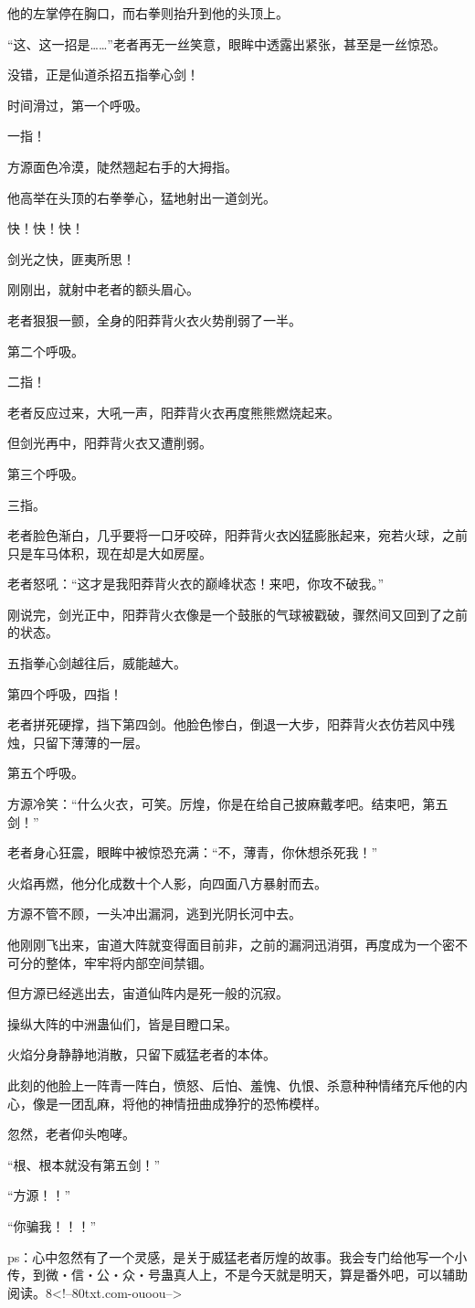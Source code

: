 \begin{this_body}
他的左掌停在胸口，而右拳则抬升到他的头顶上。

“这、这一招是……”老者再无一丝笑意，眼眸中透露出紧张，甚至是一丝惊恐。

没错，正是仙道杀招五指拳心剑！

时间滑过，第一个呼吸。

一指！

方源面色冷漠，陡然翘起右手的大拇指。

他高举在头顶的右拳拳心，猛地射出一道剑光。

快！快！快！

剑光之快，匪夷所思！

刚刚出，就射中老者的额头眉心。

老者狠狠一颤，全身的阳莽背火衣火势削弱了一半。

第二个呼吸。

二指！

老者反应过来，大吼一声，阳莽背火衣再度熊熊燃烧起来。

但剑光再中，阳莽背火衣又遭削弱。

第三个呼吸。

三指。

老者脸色渐白，几乎要将一口牙咬碎，阳莽背火衣凶猛膨胀起来，宛若火球，之前只是车马体积，现在却是大如房屋。

老者怒吼：“这才是我阳莽背火衣的巅峰状态！来吧，你攻不破我。”

刚说完，剑光正中，阳莽背火衣像是一个鼓胀的气球被戳破，骤然间又回到了之前的状态。

五指拳心剑越往后，威能越大。

第四个呼吸，四指！

老者拼死硬撑，挡下第四剑。他脸色惨白，倒退一大步，阳莽背火衣仿若风中残烛，只留下薄薄的一层。

第五个呼吸。

方源冷笑：“什么火衣，可笑。厉煌，你是在给自己披麻戴孝吧。结束吧，第五剑！”

老者身心狂震，眼眸中被惊恐充满：“不，薄青，你休想杀死我！”

火焰再燃，他分化成数十个人影，向四面八方暴射而去。

方源不管不顾，一头冲出漏洞，逃到光阴长河中去。

他刚刚飞出来，宙道大阵就变得面目前非，之前的漏洞迅消弭，再度成为一个密不可分的整体，牢牢将内部空间禁锢。

但方源已经逃出去，宙道仙阵内是死一般的沉寂。

操纵大阵的中洲蛊仙们，皆是目瞪口呆。

火焰分身静静地消散，只留下威猛老者的本体。

此刻的他脸上一阵青一阵白，愤怒、后怕、羞愧、仇恨、杀意种种情绪充斥他的内心，像是一团乱麻，将他的神情扭曲成狰狞的恐怖模样。

忽然，老者仰头咆哮。

“根、根本就没有第五剑！”

“方源！！”

“你骗我！！！”

ps：心中忽然有了一个灵感，是关于威猛老者厉煌的故事。我会专门给他写一个小传，到微・信・公・众・号蛊真人上，不是今天就是明天，算是番外吧，可以辅助阅读。8<!--80txt.com-ouoou-->

\end{this_body}

